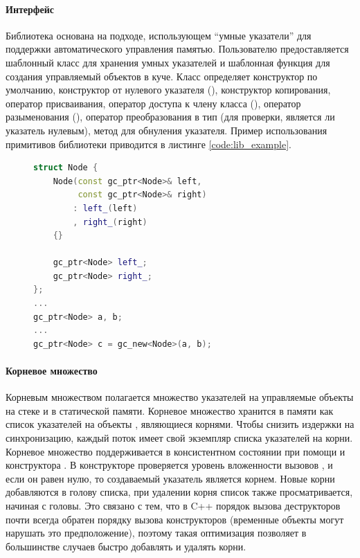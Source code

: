 \paragraph{Интерфейс}
Библиотека основана на подходе, использующем ``умные указатели'' для поддержки 
автоматического управления памятью. 
Пользователю предоставляется шаблонный класс  для хранения умных 
указателей и шаблонная функция  для создания управляемый объектов в куче. 
Класс  определяет конструктор по умолчанию, конструктор от нулевого указателя 
(), конструктор копирования, оператор присваивания, оператор доступа к члену 
класса (), оператор разыменования (), оператор 
преобразования в тип  (для проверки, является ли указатель нулевым), 
метод  для обнуления указателя. 
Пример использования примитивов библиотеки приводится в листинге \ref{code:lib_example}. 

\begin{figure}[h!]
\begin{lstlisting}[language={c++}, caption={Пример использования примитивов библиотеки}, 
label={code:lib_example}]
struct Node {
    Node(const gc_ptr<Node>& left, 
         const gc_ptr<Node>& right)
        : left_(left)
        , right_(right)
    {}
    
    gc_ptr<Node> left_;
    gc_ptr<Node> right_;
};
...
gc_ptr<Node> a, b;
...
gc_ptr<Node> c = gc_new<Node>(a, b);
\end{lstlisting}
\end{figure}

\paragraph{Корневое множество}
Корневым множеством полагается множество указателей на управляемые объекты на стеке и 
в статической памяти. 
Корневое множество хранится в памяти как список указателей на объекты , 
являющиеся корнями. 
Чтобы снизить издержки на синхронизацию, каждый поток имеет свой экземпляр списка 
указателей на корни. 
Корневое множество поддерживается в консистентном состоянии при помощи  и 
конструктора . 
В конструкторе  проверяется уровень вложенности вызовов , и 
если он равен нулю, то создаваемый указатель является корнем. 
Новые корни добавляются в голову списка, при удалении корня список также просматривается, 
начиная с головы. 
Это связано с тем, что в C++ порядок вызова деструкторов почти всегда обратен порядку 
вызова конструкторов (временные объекты могут нарушать это предположение), поэтому такая 
оптимизация позволяет в большинстве случаев быстро добавлять и удалять корни.

